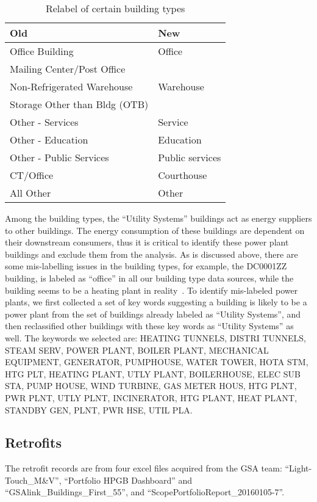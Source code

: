 \documentclass[12pt]{article}
\begin{document}
\begin{table}[H]
  \caption{Relabel of certain building types}
  \centering
  \fontsize{10}{12}\selectfont
  \begin{tabular}{l|l}
    \toprule
    Old&New\\
    \midrule
    Office Building & Office \\
    Mailing Center/Post Office & \\
    \midrule
    Non-Refrigerated Warehouse & Warehouse\\
    Storage Other than Bldg (OTB) & \\
    \midrule
    Other - Services & Service\\
    Other - Education & Education \\
    Other - Public Services & Public services \\
    CT/Office & Courthouse \\
    All Other & Other \\
    \bottomrule
  \end{tabular}
  \label{tab:building_type_relabel}
\end{table}

Among the building types, the ``Utility Systems'' buildings act as energy
suppliers to other buildings. The energy consumption of these buildings are
dependent on their downstream consumers, thus it is critical to identify these
power plant buildings and exclude them from the analysis. As is discussed above,
there are some mis-labelling issues in the building types, for example, the
DC0001ZZ building, is labeled as ``office'' in all our building type data
sources, while the building seems to be a heating plant in reality~\cite{dc0001zz2017}.
To identify mis-labeled power plants, we first collected a set of key words
suggesting a building is likely to be a power plant from the set of buildings
already labeled as ``Utility Systems'', and then reclassified other buildings with
these key words as ``Utility Systems'' as well. The keywords we selected are:
HEATING TUNNELS, DISTRI TUNNELS, STEAM SERV, POWER PLANT, BOILER PLANT,
MECHANICAL EQUIPMENT, GENERATOR, PUMPHOUSE, WATER TOWER, HOTA STM, HTG PLT,
HEATING PLANT, UTLY PLANT, BOILERHOUSE, ELEC SUB STA, PUMP HOUSE, WIND TURBINE,
GAS METER HOUS, HTG PLNT, PWR PLNT, UTLY PLNT, INCINERATOR, HTG PLANT, HEAT
PLANT, STANDBY GEN, PLNT, PWR HSE, UTIL PLA.

\subsection{Retrofits}
The retrofit records are from four excel files acquired from the GSA team:
``Light-Touch\_M\&V'', ``Portfolio HPGB Dashboard'' and
``GSAlink\_Buildings\_First\_55'', and ``ScopePortfolioReport\_20160105-7''.
\end{document}

